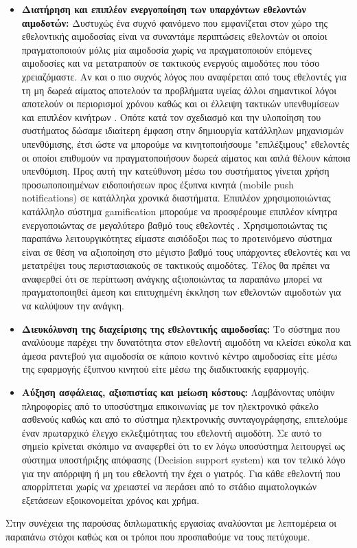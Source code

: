 \begin{itemize}
	\item \textbf{Διατήρηση και επιπλέον ενεργοποίηση των υπαρχόντων εθελοντών αιμοδοτών:} Δυστυχώς ένα συχνό φαινόμενο που εμφανίζεται στον χώρο της εθελοντικής αιμοδοσίας είναι να συναντάμε περιπτώσεις εθελοντών οι οποίοι πραγματοποιούν μόλις μία αιμοδοσία χωρίς να πραγματοποιούν επόμενες αιμοδοσίες και να μετατραπούν σε τακτικούς ενεργούς αιμοδότες που τόσο χρειαζόμαστε. Αν και ο πιο συχνός λόγος που αναφέρεται από τους εθελοντές για τη μη δωρεά αίματος αποτελούν τα προβλήματα υγείας άλλοι σημαντικοί λόγοι αποτελούν οι περιορισμοί χρόνου καθώς και οι έλλειψη τακτικών υπενθυμίσεων και επιπλέον κινήτρων \cite{Marantidou2007}. Οπότε κατά τον σχεδιασμό και την υλοποίηση του συστήματος δώσαμε ιδιαίτερη έμφαση στην δημιουργία κατάλληλων μηχανισμών υπενθύμισης, έτσι ώστε να μπορούμε να κινητοποιήσουμε "επιλέξιμους" εθελοντές οι οποίοι επιθυμούν να πραγματοποιήσουν δωρεά αίματος και απλά θέλουν κάποια υπενθύμιση. Προς αυτή την κατεύθυνση μέσω του συστήματος γίνεται χρήση προσωποποιημένων ειδοποιήσεων προς έξυπνα κινητά (mobile push notifications) σε κατάλληλα χρονικά διαστήματα. Επιπλέον χρησιμοποιώντας κατάλληλο σύστημα gamification μπορούμε να προσφέρουμε επιπλέον κίνητρα ενεργοποιώντας σε μεγαλύτερο βαθμό τους εθελοντές \cite{TheGameOfLife}. Χρησιμοποιώντας τις παραπάνω λειτουργικότητες είμαστε αισιόδοξοι πως το προτεινόμενο σύστημα είναι σε θέση να αξιοποίηση στο μέγιστο βαθμό τους υπάρχοντες εθελοντές και να μετατρέψει τους περιστασιακούς σε τακτικούς αιμοδότες. Τέλος θα πρέπει να αναφερθεί ότι σε περίπτωση ανάγκης αξιοποιώντας τα παραπάνω μπορεί να πραγματοποιηθεί άμεση και επιτυχημένη έκκληση των εθελοντών αιμοδοτών για να καλύψουν την ανάγκη.
	\item \textbf{Διευκόλυνση της διαχείρισης της εθελοντικής αιμοδοσίας:} Το σύστημα που αναλύουμε παρέχει την δυνατότητα στον εθελοντή αιμοδότη να κλείσει εύκολα και άμεσα ραντεβού για αιμοδοσία σε κάποιο κοντινό κέντρο αιμοδοσίας είτε μέσω της εφαρμογής έξυπνου κινητού είτε μέσω της διαδικτυακής εφαρμογής.
	\item \textbf{Αύξηση ασφάλειας, αξιοπιστίας και μείωση κόστους:} Λαμβάνοντας υπόψιν πληροφορίες από το υποσύστημα επικοινωνίας με τον ηλεκτρονικό φάκελο ασθενούς καθώς και από το σύστημα ηλεκτρονικής συνταγογράφησης, επιτελούμε έναν πρωταρχικό έλεγχο εκλεξιμότητας του εθελοντή αιμοδότη. Σε αυτό το σημείο κρίνεται σκόπιμο να αναφερθεί ότι το εν λόγω υποσύστημα λειτουργεί ως σύστημα υποστήριξης απόφασης (Decision support system) και τον τελικό λόγο για την απόρριψη ή μη του εθελοντή την έχει ο γιατρός. Για κάθε εθελοντή που απορρίπτεται χωρίς να χρειαστεί να περάσει από το στάδιο αιματολογικών εξετάσεων εξοικονομείται χρόνος και χρήμα.
\end{itemize}
Στην συνέχεια της παρούσας διπλωματικής εργασίας αναλύονται με λεπτομέρεια οι παραπάνω στόχοι καθώς και οι τρόποι που προσπαθούμε να τους πετύχουμε.
